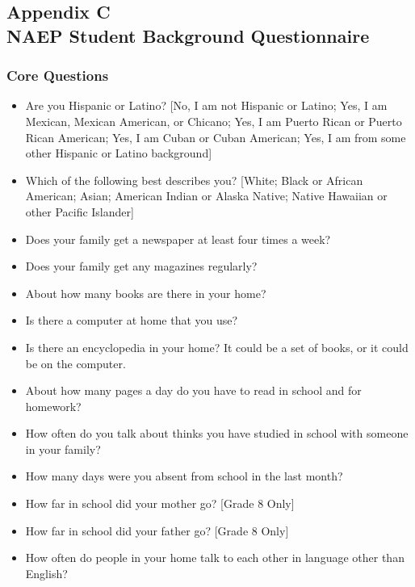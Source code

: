 \newpage
{}
\subsection*{Appendix C\\NAEP Student Background Questionnaire}
\label{appendixDemographics}
\begin{singlespace}
\subsubsection{Core Questions}
\begin{itemize}
	\item Are you Hispanic or Latino? [No, I am not Hispanic or Latino; Yes, I am Mexican, Mexican American, or Chicano; Yes, I am Puerto Rican or Puerto Rican American; Yes, I am Cuban or Cuban American; Yes, I am from some other Hispanic or Latino background]
	\item Which of the following best describes you? [White; Black or African American; Asian; American Indian or Alaska Native; Native Hawaiian or other Pacific Islander]
	\item Does your family get a newspaper at least four times a week?
	\item Does your family get any magazines regularly?
	\item About how many books are there in your home?
	\item Is there a computer at home that you use?
	\item Is there an encyclopedia in your home? It could be a set of books, or it could be on the computer.
	\item About how many pages a day do you have to read in school and for homework?
	\item How often do you talk about thinks you have studied in school with someone in your family?
	\item How many days were you absent from school in the last month?
	\item How far in school did your mother go? [Grade 8 Only]
	\item How far in school did your father go? [Grade 8 Only]
	\item How often do people in your home talk to each other in language other than English?
\end{itemize}


\end{singlespace}
